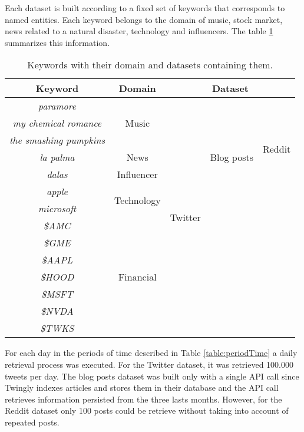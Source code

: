 Each dataset is built according to a fixed set of keywords that corresponds to named entities. Each keyword belongs to the domain of music, stock market, news related to a natural disaster, technology and influencers. The table \ref{table:keywords} summarizes this information.\\

\begin{table}[h]
	\centering
	\begin{tabular}{|c|c|c|c|c|}
		\hline
		\textbf{Keyword} & \textbf{Domain} & \multicolumn{3}{c|}{\textbf{Dataset}} \bigstrut\\
		\hline \hline
		\textit{paramore} & \multirow{3}[6]{*}{Music} & \multirow{14}[28]{*}{Twitter} & \multirow{7}[14]{*}{Blog posts} & \multirow{6}[12]{*}{Reddit} \bigstrut\\
		\cline{1-1}    \textit{my chemical romance} &       &       &       &  \bigstrut\\
		\cline{1-1}    \textit{the smashing pumpkins} &       &       &       &  \bigstrut\\
		\cline{1-2}    \textit{la palma} & News  &       &       &  \bigstrut\\
		\cline{1-2}    \textit{dalas} & Influencer &       &       &  \bigstrut\\
		\cline{1-2}    \textit{apple} & \multirow{2}[4]{*}{Technology} &       &       &  \bigstrut\\
		\cline{1-1}\cline{5-5}    \textit{microsoft} &       &       &       & \multirow{8}[16]{*}{} \bigstrut\\
		\cline{1-2}\cline{4-4}    \textit{\$AMC} & \multirow{7}[14]{*}{Financial} &       & \multirow{7}[14]{*}{} &  \bigstrut\\
		\cline{1-1}    \textit{\$GME} &       &       &       &  \bigstrut\\
		\cline{1-1}    \textit{\$AAPL} &       &       &       &  \bigstrut\\
		\cline{1-1}    \textit{\$HOOD} &       &       &       &  \bigstrut\\
		\cline{1-1}    \textit{\$MSFT} &       &       &       &  \bigstrut\\
		\cline{1-1}    \textit{\$NVDA} &       &       &       &  \bigstrut\\
		\cline{1-1}    \textit{\$TWKS} &       &       &       &  \bigstrut\\
		\hline
	\end{tabular}%
	\label{table:keywords}%
	\caption{Keywords with their domain and datasets containing them.}
\end{table}%
\par 
For each day in the periods of time described in Table \ref{table:periodTime} a daily retrieval process was executed. For the Twitter dataset, it was retrieved 100.000 tweets per day. The blog posts dataset was built only with a single API call since Twingly indexes articles and stores them in their database and the API call retrieves information persisted from the three lasts months.
However, for the Reddit dataset only 100 posts could be retrieve without taking into account of repeated posts.
